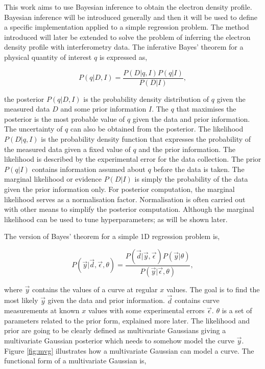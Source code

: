 This work aims to use Bayesian inference to obtain the electron density profile. Bayesian inference will be introduced generally and then it will be used to define a specific implementation applied to a simple regression problem. The method introduced will later be extended to solve the problem of inferring the electron density profile with interferometry data. The inferative Bayes' theorem for a physical quantity of interest $q$ is expressed as,

\begin{equation}
P(q|D,I) = \frac{P(D|q,I) P(q|I)}{P(D|I)},
\label{eq:bayesth}
\end{equation}

\noindent the posterior $P(q|D,I)$ is the probability density distribution of $q$ given the measured data $D$ and some prior information $I$. The $q$ that maximises the posterior is the most probable value of $q$ given the data and prior information. The uncertainty of $q$ can also be obtained from the posterior. The likelihood $P(D|q,I)$ is the probability density function that expresses the probability of the measured data given a fixed value of $q$ and the prior information. The likelihood is described by the experimental error for the data collection. The prior $P(q|I)$ contains information assumed about $q$ before the data is taken. The marginal likelihood or evidence $P(D|I)$ is simply the probability of the data given the prior information only. For posterior computation, the marginal likelihood serves as a normalisation factor. Normalisation is often carried out with other means to simplify the posterior computation. Although the marginal likelihood can be used to tune hyperparameters; as will be shown later.

The version of Bayes' theorem for a simple 1D regression problem is,

\begin{equation} 
  P(\vec{y}|\vec{d},\vec \epsilon, \theta) = \frac{P(\vec{d}|\vec{y},\vec \epsilon) P(\vec y|\theta)}{P(\vec y|\vec \epsilon, \theta)},
  \label{eq:bayesth_simple_regression}
\end{equation}

\noindent where $\vec y$ contains the values of a curve at regular $x$ values. The goal is to find the most likely $\vec y$ given the data and prior information. $\vec d$ contains curve measurements at known $x$ values with some experimental errors $\vec \epsilon$. $\theta$ is a set of parameters related to the prior form, explained more later. The likelihood and prior are going to be clearly defined as multivariate Gaussians giving a multivariate Gaussian posterior which needs to somehow model the curve $\vec y$. Figure \ref{fig:mvg} illustrates how a multivariate Gaussian can model a curve. The functional form of a multivariate Gaussian is,

